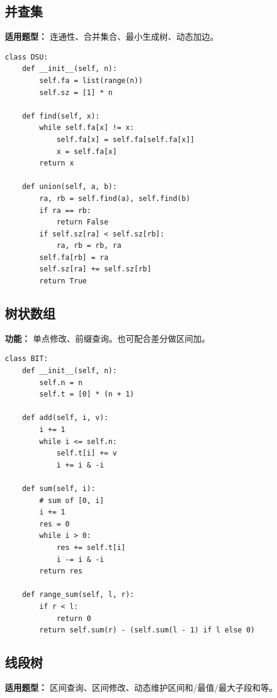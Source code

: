 \documentclass[UTF8,a4paper,14pt]{ctexart}
\begin{document}
\subsection{并查集}

\textbf{适用题型：}
连通性、合并集合、最小生成树、动态加边。

\begin{lstlisting}
class DSU:
    def __init__(self, n):
        self.fa = list(range(n))
        self.sz = [1] * n

    def find(self, x):
        while self.fa[x] != x:
            self.fa[x] = self.fa[self.fa[x]]
            x = self.fa[x]
        return x

    def union(self, a, b):
        ra, rb = self.find(a), self.find(b)
        if ra == rb:
            return False
        if self.sz[ra] < self.sz[rb]:
            ra, rb = rb, ra
        self.fa[rb] = ra
        self.sz[ra] += self.sz[rb]
        return True
\end{lstlisting}

\subsection{树状数组}

\textbf{功能：}
单点修改、前缀查询。也可配合差分做区间加。

\begin{lstlisting}
class BIT:
    def __init__(self, n):
        self.n = n
        self.t = [0] * (n + 1)

    def add(self, i, v):
        i += 1
        while i <= self.n:
            self.t[i] += v
            i += i & -i

    def sum(self, i):
        # sum of [0, i]
        i += 1
        res = 0
        while i > 0:
            res += self.t[i]
            i -= i & -i
        return res

    def range_sum(self, l, r):
        if r < l:
            return 0
        return self.sum(r) - (self.sum(l - 1) if l else 0)
\end{lstlisting}

\subsection{线段树}

\textbf{适用题型：}
区间查询、区间修改、动态维护区间和/最值/最大子段和等。
\end{document}
